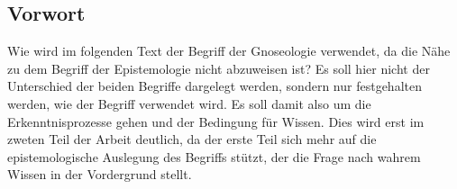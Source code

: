 \documentclass[12pt]{article}
\begin{document}

\newpage
{}
\subsection*{Vorwort}
Wie wird im folgenden Text der Begriff der Gnoseologie verwendet, da die Nähe zu dem Begriff der Epistemologie nicht abzuweisen ist? Es soll hier nicht der Unterschied der beiden Begriffe dargelegt werden, sondern nur festgehalten werden, wie der Begriff verwendet wird. Es soll damit also um die Erkenntnisprozesse gehen und der Bedingung für Wissen. Dies wird erst im zweten Teil der Arbeit deutlich, da der erste Teil sich mehr auf die epistemologische Auslegung des Begriffs stützt, der die Frage nach wahrem Wissen in der Vordergrund stellt.   
\newpage
\tableofcontents
\newpage
\pagestyle{fancy}
\fancyhf{}
\fancyfoot[R]{\thepage}
\setcounter{page}{1}
\justifying


% 




 


\end{document}

